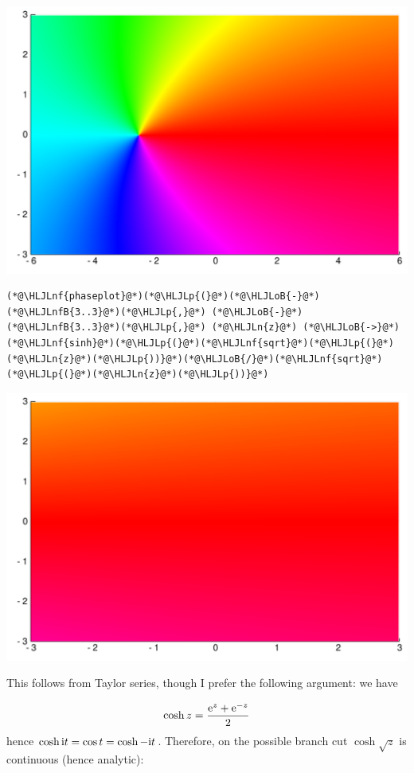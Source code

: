 \documentclass[12pt,a4paper]{article}
\newcommand{\HLJLn}[1]{#1}
\newcommand{\HLJLnf}[1]{\textcolor[RGB]{66,102,213}{#1}}
\newcommand{\HLJLnfB}[1]{\textcolor[RGB]{59,151,46}{#1}}
\newcommand{\HLJLoB}[1]{\textcolor[RGB]{102,102,102}{\textbf{#1}}}
\newcommand{\HLJLp}[1]{#1}
\def\I{ {\rm i} }
\def\E{ {\rm e} }
\begin{document}
\includegraphics[width=\linewidth]{figures/Solutions1_24_1.pdf}

\begin{lstlisting}
(*@\HLJLnf{phaseplot}@*)(*@\HLJLp{(}@*)(*@\HLJLoB{-}@*)(*@\HLJLnfB{3..3}@*)(*@\HLJLp{,}@*) (*@\HLJLoB{-}@*)(*@\HLJLnfB{3..3}@*)(*@\HLJLp{,}@*) (*@\HLJLn{z}@*) (*@\HLJLoB{->}@*) (*@\HLJLnf{sinh}@*)(*@\HLJLp{(}@*)(*@\HLJLnf{sqrt}@*)(*@\HLJLp{(}@*)(*@\HLJLn{z}@*)(*@\HLJLp{))}@*)(*@\HLJLoB{/}@*)(*@\HLJLnf{sqrt}@*)(*@\HLJLp{(}@*)(*@\HLJLn{z}@*)(*@\HLJLp{))}@*)
\end{lstlisting}

\includegraphics[width=\linewidth]{figures/Solutions1_25_1.pdf}

This follows from Taylor series, though I prefer the following argument: we have

\[
\cosh z = {\E^{z} + \E^{-z} \over 2}
\]
hence $\cosh{\I t } = \cos t = \cosh{-\I t}$. Therefore, on the possible branch cut $\cosh \sqrt z$ is continuous (hence analytic):
\end{document}
